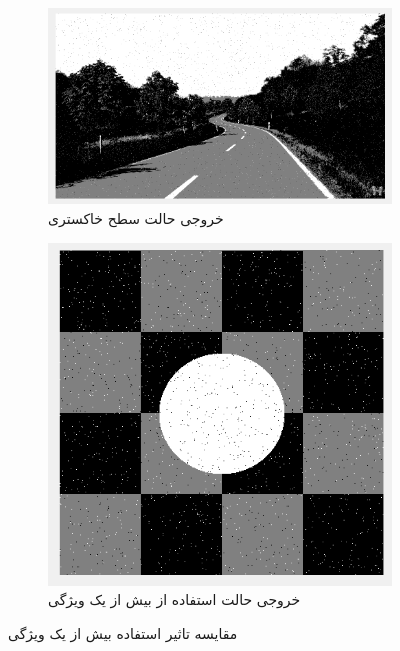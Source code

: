 \documentclass[11.5pt,a4paper]{article}
\begin{document}
\begin{figure}[h]
\center
	\begin{subfigure}{0.4\textwidth}
	\includegraphics[scale=0.2]{Imgs/iter9_Gray_Classification.png}
	\caption{خروجی حالت سطح خاکستری}
	\end{subfigure}
	\begin{subfigure}{0.4\textwidth}
	\includegraphics[scale=0.3]{Imgs/MRF_Iter4_TExp.png}
	\caption{خروجی حالت استفاده از بیش از یک ویژگی}
	\end{subfigure}	
\caption{مقایسه تاثیر استفاده بیش از یک ویژگی}
\label{fig:MultFeat}
\end{figure}


\vfill
\end{document}

